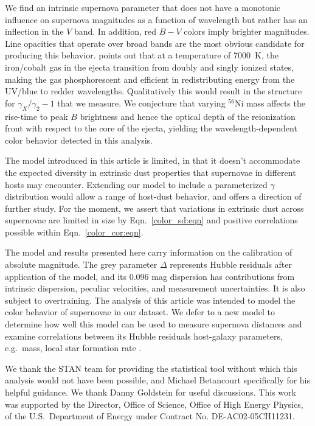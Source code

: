 \documentclass{aastex}   	%
\begin{document}
We find an intrinsic supernova parameter that does not have a monotonic influence on supernova magnitudes as a function
of wavelength but rather has an inflection in the $V$ band.  In addition, red $B-V$ colors imply brighter magnitudes.  Line opacities
that operate over broad bands are the most obvious candidate for producing this behavior.
\citet{2006ApJ...649..939K} points out that at a temperature of 7000~K, the iron/cobalt gas in the ejecta transition
from doubly and singly ionized states, making the gas phosphorescent and efficient in redistributing energy from the UV/blue to redder
wavelengths.  Qualitatively this would result in the structure for $\gamma_X/\gamma_2-1$ that we measure.
We conjecture that varying $^{56}$Ni mass affects the rise-time to peak $B$ brightness and hence the optical depth
of the reionization front with respect to the core of the ejecta, yielding the wavelength-dependent color behavior
detected in this analysis.

The model introduced in this article is limited, in that it doesn't accommodate the expected diversity
in extrinsic dust properties that supernovae in different hosts may encounter.  Extending our model to 
include  a parameterized  $\gamma$ distribution would allow a range of host-dust behavior, and
offers a direction of further study.
For the moment, we assert that variations in extrinsic dust across supernovae are limited in
size by Eqn.~\ref{color_sd:eqn} and positive correlations possible within Eqn.~\ref{color_cor:eqn}.


The model and results presented here
carry information on the calibration of absolute magnitude.  The grey parameter $\Delta$ represents Hubble residuals after
application of the model, and its  $0.096$ mag dispersion has contributions from intrinsic dispersion, peculiar velocities, and
measurement uncertainties.  It is also subject to overtraining.
The  analysis of this article was intended to model the color behavior of supernovae in our dataset.
We defer to a new model to determine how
well this model can be used to measure supernova distances
and examine correlations between its Hubble residuals host-galaxy parameters, e.g.\ mass,
local star formation rate \citep{2010ApJ...715..743K, 2013A&A...560A..66R}.


\acknowledgments
We thank the STAN team for providing the statistical tool without which this analysis would not have been possible,
and Michael Betancourt specifically for his helpful guidance.  We thank Danny Goldstein for useful discussions.
This work was supported by the Director, Office of Science, Office of High Energy Physics, 
of the U.S.\ Department of Energy under Contract No. DE-AC02-05CH11231.



\end{document}
